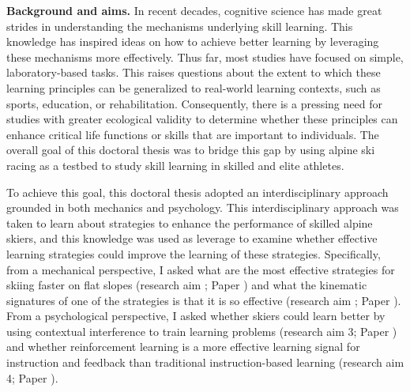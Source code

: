 \setlength{\parindent}{0pt} %
\setlength{\parskip}{1em}   %
\textbf{Background and aims.} In recent decades, cognitive science has made great strides in understanding the mechanisms underlying skill learning. This knowledge has inspired ideas on how to achieve better learning by leveraging these mechanisms more effectively. Thus far, most studies have focused on simple, laboratory-based tasks. This raises questions about the extent to which these learning principles can be generalized to real-world learning contexts, such as sports, education, or rehabilitation. Consequently, there is a pressing need for studies with greater ecological validity to determine whether these principles can enhance critical life functions or skills that are important to individuals. The overall goal of this doctoral thesis was to bridge this gap by using alpine ski racing as a testbed to study skill learning in skilled and elite athletes.

To achieve this goal, this doctoral thesis adopted an interdisciplinary approach grounded in both mechanics and psychology. This interdisciplinary approach was taken to learn about strategies to enhance the performance of skilled alpine skiers, and this knowledge was used as leverage to examine whether effective learning strategies could improve the learning of these strategies. Specifically, from a mechanical perspective, I asked what are the most effective strategies for skiing faster on flat slopes (research aim ; Paper ) and what the kinematic signatures of one of the strategies is that it is so effective (research aim  ; Paper ). From a psychological perspective, I asked whether skiers could learn better by using contextual interference to train learning problems (research aim 3; Paper ) and whether reinforcement learning is a more effective learning signal for instruction and feedback than traditional instruction-based learning (research aim 4; Paper ). 



